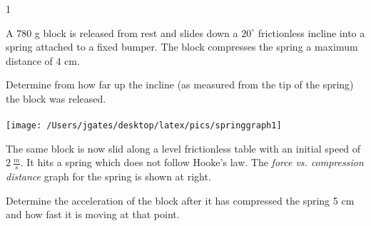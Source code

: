 
\AddToShipoutPicture*{\BackgroundPic}

\addtocounter {ProbNum} {1}

 
{\bf \Large{}} A 780 g block is released from rest and slides down a $20^{\circ}$ frictionless incline into a spring attached to a fixed bumper.  The block compresses the spring a maximum distance of 4 cm.  

\bigskip
Determine from how far up the incline (as measured from the tip of the spring) the block was released.\paragraph{}
\noindent
\vfill

\begin{floatingfigure}[r]{.5\textwidth}
\texttt{[image: /Users/jgates/desktop/latex/pics/springgraph1]}
\end{floatingfigure}

The same block is now slid along a level frictionless table with an initial speed of ${2~\tfrac{m}{s}}$.  It hits a spring which does not follow Hooke's law.  The \emph{force vs. compression distance} graph for the spring is shown at right.

\bigskip
Determine the acceleration of the block after it has compressed the spring 5 cm and how fast it is moving at that point.
\vfill
\newpage